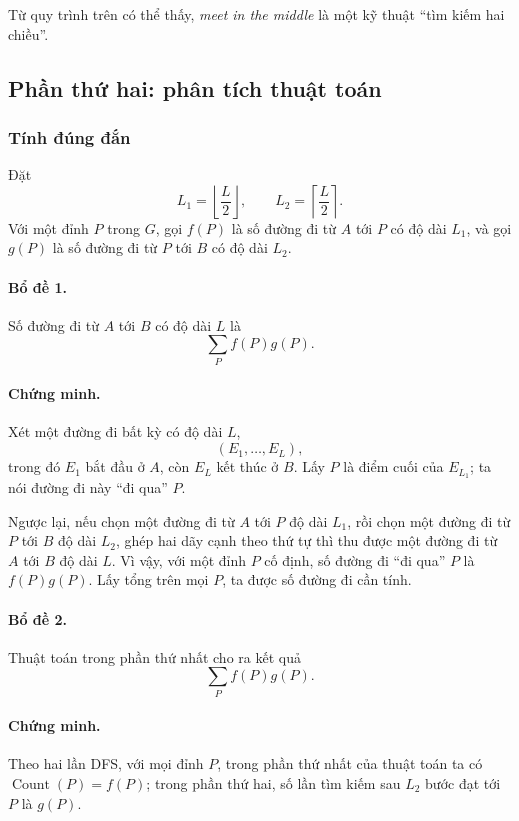 \documentclass[11pt]{article}
\begin{document}
Từ quy trình trên có thể thấy, \emph{meet in the middle} là một kỹ thuật
``tìm kiếm hai chiều''.

\subsection{Phần thứ hai: phân tích thuật toán}

\subsubsection{Tính đúng đắn}

Đặt
\[
  L_1=\left\lfloor\frac{L}{2}\right\rfloor,\qquad
  L_2=\left\lceil\frac{L}{2}\right\rceil.
\]
Với một đỉnh \(P\) trong \(G\), gọi \(f(P)\) là số đường đi từ \(A\) tới
\(P\) có độ dài \(L_1\), và gọi \(g(P)\) là số đường đi từ \(P\) tới \(B\)
có độ dài \(L_2\).

\paragraph{Bổ đề 1.}
Số đường đi từ \(A\) tới \(B\) có độ dài \(L\) là
\[
  \sum_P f(P)g(P).
\]

\paragraph{Chứng minh.}
Xét một đường đi bất kỳ có độ dài \(L\),
\[
  (E_1,\ldots,E_L),
\]
trong đó \(E_1\) bắt đầu ở \(A\), còn \(E_L\) kết thúc ở \(B\). Lấy \(P\) là
điểm cuối của \(E_{L_1}\); ta nói đường đi này ``đi qua'' \(P\).

Ngược lại, nếu chọn một đường đi từ \(A\) tới \(P\) độ dài \(L_1\), rồi chọn
một đường đi từ \(P\) tới \(B\) độ dài \(L_2\), ghép hai dãy cạnh theo thứ tự
thì thu được một đường đi từ \(A\) tới \(B\) độ dài \(L\). Vì vậy, với một
đỉnh \(P\) cố định, số đường đi ``đi qua'' \(P\) là \(f(P)g(P)\). Lấy tổng
trên mọi \(P\), ta được số đường đi cần tính.

\paragraph{Bổ đề 2.}
Thuật toán trong phần thứ nhất cho ra kết quả
\[
  \sum_P f(P)g(P).
\]

\paragraph{Chứng minh.}
Theo hai lần DFS, với mọi đỉnh \(P\), trong phần thứ nhất của thuật toán ta
có \(\operatorname{Count}(P)=f(P)\); trong phần thứ hai, số lần tìm kiếm sau
\(L_2\) bước đạt tới \(P\) là \(g(P)\).
\end{document}

